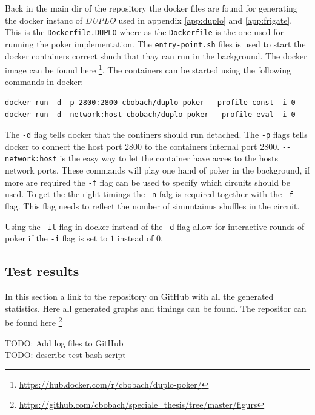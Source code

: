 \documentclass[twoside,11pt,openright]{report}
\newcommand{\todo}[1]{}
\renewcommand{\todo}[1]{{\color{red} TODO: {#1}} \\}
\newcommand{\DUPLO}{\textit{DUPLO} }
\begin{document}
\begin{appendices}
\bigskip

Back in the main dir of the repository the docker files are found for generating the docker instanc of \DUPLO used in appendix \ref{app:duplo} and \ref{app:frigate}. This is the \verb|Dockerfile.DUPLO| where as the \verb|Dockerfile| is the one used for running the poker implementation. The \verb|entry-point.sh| files is used to start the docker containers correct shuch that thay can run in the background. The docker image can be found here \footnote{\url{https://hub.docker.com/r/cbobach/duplo-poker/}}. The containers can be started using the following commands in docker:

\begin{center}
\begin{verbatim}
docker run -d -p 2800:2800 cbobach/duplo-poker --profile const -i 0
docker run -d -network:host cbobach/duplo-poker --profile eval -i 0
\end{verbatim}
\end{center}

The \verb|-d| flag tells docker that the continers should run detached. The \verb|-p| flags tells docker to connect the host port $2800$ to the containers internal port 2800. \verb|--network:host| is the easy way to let the container have acces to the hosts network ports. These commands will play one hand of poker in the background, if more are required the \verb|-f| flag can be used to specify which circuits should be used. To get the the right timings the \verb|-n| falg is required together with the \verb|-f| flag. This flag needs to reflect the nomber of simuntainus shuffles in the circuit.

Using the \verb|-it| flag in docker instead of the \verb|-d| flag allow for interactive rounds of poker if the \verb|-i| flag is set to $1$ instead of $0$.


\subsection{Test results}
\label{app:test-res}
In this section a link to the repository on GitHub with all the generated statistics. Here all generated graphs and timings can be found. The repositor can be found here \footnote{\url{https://github.com/cbobach/speciale_thesis/tree/master/figurs}}

\todo{Add log files to GitHub}

\todo{describe test bash script}



\end{appendices}



%
%
\end{document}
